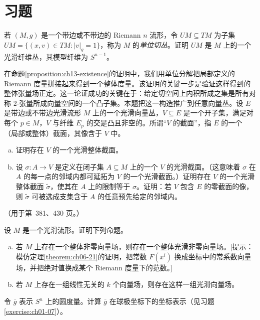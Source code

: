 \documentclass[../../main.tex]{subfiles}
\begin{document}
\section{习题}\label{section:ch13-problems}

\begin{exercise}\label{exercise:ch13-01}
若 $(M,g)$ 是一个带边或不带边的 Riemann $n$ 流形，令 $UM\subseteq TM$ 为子集 $UM=\{(x,v)\in TM:|v|_g=1\}$，称为 $M$ 的\emph{单位切丛}。证明 $UM$ 是 $M$ 上的一个光滑纤维丛，其模型纤维为 $S^{n-1}$。
\end{exercise}

\begin{exercise}\label{exercise:ch13-02}
在命题\ref{proposition:ch13-existence}的证明中，我们用单位分解把局部定义的 Riemann 度量拼接起来得到一个整体度量。该证明的关键一步是验证这样得到的整体张量场正定。这一论证成功的关键在于：给定切空间上内积所成之集是所有对称 $2$-张量所成向量空间的一个凸子集。本题把这一构造推广到任意向量丛。设 $E$ 是带边或不带边光滑流形 $M$ 上的一个光滑向量丛，$V\subseteq E$ 是一个开子集，满足对每个 $p\in M$，$V$ 与纤维 $E_p$ 的交是凸且非空的。所谓“$V$ 的截面”，指 $E$ 的一个（局部或整体）截面，其像含于 $V$ 中。
\begin{enumerate}[(a)]
\item 证明存在 $V$ 的一个光滑整体截面。
\item 设 $\sigma:A\to V$ 是定义在闭子集 $A\subseteq M$ 上的一个 $V$ 的光滑截面。（这意味着 $\sigma$ 在 $A$ 的每一点的邻域内都可延拓为 $V$ 的一个光滑截面。）证明存在 $V$ 的一个光滑整体截面 $\tilde\sigma$，使其在 $A$ 上的限制等于 $\sigma$。证明：若 $V$ 包含 $E$ 的零截面的像，则 $\tilde\sigma$ 可被选成支集含于 $A$ 的任意预先给定的邻域内。
\end{enumerate}
（用于第~381、430 页。）
\end{exercise}

\begin{exercise}\label{exercise:ch13-03}
设 $M$ 是一个光滑流形。证明下列命题。
\begin{enumerate}[(a)]
\item 若 $M$ 上存在一个整体非零向量场，则存在一个整体光滑非零向量场。[提示：模仿定理\ref{theorem:ch06-21}的证明，把常数 $F(x^i)$ 换成坐标中的常系数向量场，并把绝对值换成某个 Riemann 度量下的范数。]
\item 若 $M$ 上存在一组线性无关的 $k$ 个向量场，则存在这样一组光滑向量场。
\end{enumerate}
\end{exercise}

\begin{exercise}\label{exercise:ch13-04}
令 $\bar g$ 表示 $S^n$ 上的圆度量。计算 $\bar g$ 在球极坐标下的坐标表示（见习题\ref{exercise:ch01-07}）。
\end{exercise}
\end{document}
